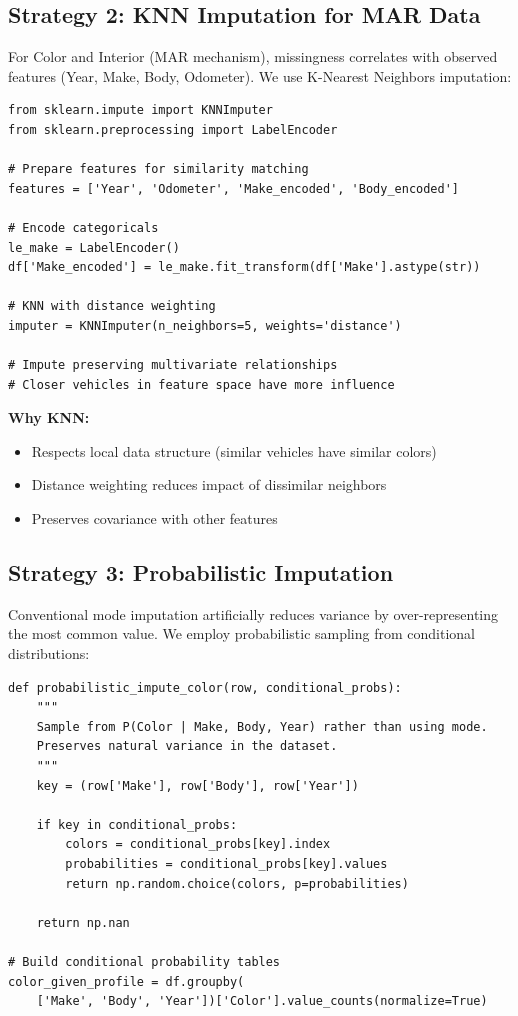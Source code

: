 \documentclass[12pt,a4paper]{article}
\begin{document}
\subsection{Strategy 2: KNN Imputation for MAR Data}

For Color and Interior (MAR mechanism), missingness correlates with observed features (Year, Make, Body, Odometer). We use K-Nearest Neighbors imputation:

\begin{lstlisting}
from sklearn.impute import KNNImputer
from sklearn.preprocessing import LabelEncoder

# Prepare features for similarity matching
features = ['Year', 'Odometer', 'Make_encoded', 'Body_encoded']

# Encode categoricals
le_make = LabelEncoder()
df['Make_encoded'] = le_make.fit_transform(df['Make'].astype(str))

# KNN with distance weighting
imputer = KNNImputer(n_neighbors=5, weights='distance')

# Impute preserving multivariate relationships
# Closer vehicles in feature space have more influence
\end{lstlisting}

\textbf{Why KNN:}
\begin{itemize}
    \item Respects local data structure (similar vehicles have similar colors)
    \item Distance weighting reduces impact of dissimilar neighbors
    \item Preserves covariance with other features
\end{itemize}

\subsection{Strategy 3: Probabilistic Imputation}

Conventional mode imputation artificially reduces variance by over-representing the most common value. We employ probabilistic sampling from conditional distributions:

\begin{lstlisting}
def probabilistic_impute_color(row, conditional_probs):
    """
    Sample from P(Color | Make, Body, Year) rather than using mode.
    Preserves natural variance in the dataset.
    """
    key = (row['Make'], row['Body'], row['Year'])

    if key in conditional_probs:
        colors = conditional_probs[key].index
        probabilities = conditional_probs[key].values
        return np.random.choice(colors, p=probabilities)

    return np.nan

# Build conditional probability tables
color_given_profile = df.groupby(
    ['Make', 'Body', 'Year'])['Color'].value_counts(normalize=True)
\end{lstlisting}
\end{document}
